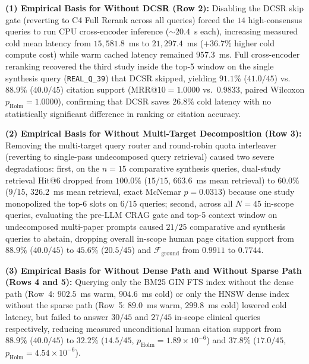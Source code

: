 \documentclass[10pt]{SPIIRAS_Proceedings}
\begin{document}
\textbf{(1) Empirical Basis for Without DCSR (Row 2):} Disabling the DCSR skip gate (reverting to C4 Full Rerank across all queries) forced the $14$ high-consensus queries to run CPU cross-encoder inference ($\sim 20.4$~s each), increasing measured cold mean latency from $15,581.8$~ms to $21,297.4$~ms ($+36.7\%$ higher cold compute cost) while warm cached latency remained $957.3$~ms. Full cross-encoder reranking recovered the third study inside the top-5 window on the single synthesis query (\texttt{REAL\_Q\_39}) that DCSR skipped, yielding $91.1\%$ ($41.0/45$) vs.\ $88.9\%$ ($40.0/45$) citation support ($\mathrm{MRR@10} = 1.0000$ vs.\ $0.9833$, paired Wilcoxon $p_{\mathrm{Holm}} = 1.0000$), confirming that DCSR saves $26.8\%$ cold latency with no statistically significant difference in ranking or citation accuracy.

\textbf{(2) Empirical Basis for Without Multi-Target Decomposition (Row 3):} Removing the multi-target query router and round-robin quota interleaver (reverting to single-pass undecomposed query retrieval) caused two severe degradations: first, on the $n = 15$ comparative synthesis queries, dual-study retrieval $\mathrm{Hit@6}$ dropped from $100.0\%$ ($15/15$, $663.6$~ms mean retrieval) to $60.0\%$ ($9/15$, $326.2$~ms mean retrieval, exact McNemar $p = 0.0313$) because one study monopolized the top-6 slots on $6/15$ queries; second, across all $N = 45$ in-scope queries, evaluating the pre-LLM CRAG gate and top-5 context window on undecomposed multi-paper prompts caused $21/25$ comparative and synthesis queries to abstain, dropping overall in-scope human page citation support from $88.9\%$ ($40.0/45$) to $45.6\%$ ($20.5/45$) and $\mathcal{F}_{\mathrm{ground}}$ from $0.9911$ to $0.7744$.

\textbf{(3) Empirical Basis for Without Dense Path and Without Sparse Path (Rows 4 and 5):} Querying only the BM25 GIN FTS index without the dense path (Row~4: $902.5$~ms warm, $904.6$~ms cold) or only the HNSW dense index without the sparse path (Row~5: $89.0$~ms warm, $299.8$~ms cold) lowered cold latency, but failed to answer $30/45$ and $27/45$ in-scope clinical queries respectively, reducing measured unconditional human citation support from $88.9\%$ ($40.0/45$) to $32.2\%$ ($14.5/45$, $p_{\mathrm{Holm}} = 1.89 \times 10^{-6}$) and $37.8\%$ ($17.0/45$, $p_{\mathrm{Holm}} = 4.54 \times 10^{-6}$).
\end{document}
